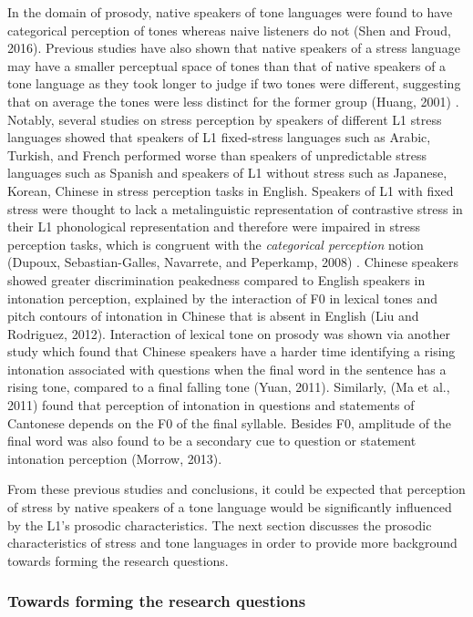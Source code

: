 \documentclass[a4paper]{article}
\begin{document}
In the domain of prosody, native speakers of tone languages were found to have categorical perception of tones whereas naive listeners do not (Shen and Froud, 2016). Previous studies have also shown that native speakers of a stress language may have a smaller perceptual space of tones than that of native speakers of a tone language as they took longer to judge if two tones were different, suggesting that on average the tones were less distinct for the former group (Huang, 2001) \cite{Huang:2001aa}. Notably, several studies on stress perception by speakers of different L1 stress languages showed that speakers of L1 fixed-stress languages such as Arabic, Turkish, and French performed worse than speakers of unpredictable stress languages such as Spanish and speakers of L1 without stress such as Japanese, Korean, Chinese in stress perception tasks in English. Speakers of L1 with fixed stress were thought to lack a metalinguistic representation of contrastive stress in their L1 phonological representation and therefore were impaired in stress perception tasks, which is congruent with the \textit{categorical perception} notion (Dupoux, Sebastian-Galles, Navarrete, and Peperkamp, 2008) \cite{Dupoux:2008aa}. Chinese speakers showed greater discrimination peakedness compared to English speakers in intonation perception, explained by the interaction of F0 in lexical tones and pitch contours of intonation in Chinese that is absent in English (Liu and Rodriguez, 2012). Interaction of lexical tone on prosody was shown via another study which found that Chinese speakers have a harder time identifying a rising intonation associated with questions when the final word in the sentence has a rising tone, compared to a final falling tone (Yuan, 2011). Similarly, (Ma et al., 2011) found that perception of intonation in questions and statements of Cantonese depends on the F0 of the final syllable. Besides F0, amplitude of the final word was also found to be a secondary cue to question or statement intonation perception (Morrow, 2013). 

From these previous studies and conclusions, it could be expected that perception of stress by native speakers of a tone language would be significantly influenced by the L1's prosodic characteristics. The next section discusses the prosodic characteristics of stress and tone languages in order to provide more background towards forming the research questions.


\subsubsection{Towards forming the research questions}
\end{document}
